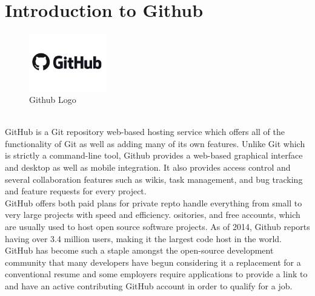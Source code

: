 \section{Introduction to Github}
\begin{figure}[!ht]
\centering
\includegraphics[width=0.3\textwidth]{images/github}                   
\caption{Github Logo}
\hspace{-1.5em}
\end{figure}
\leavevmode\\
GitHub is a Git repository web-based hosting service which offers all of the functionality of Git as well as adding many of its own features. Unlike Git which is strictly a command-line tool, Github provides a web-based graphical interface and desktop as well as mobile integration. It also provides access control and several collaboration features such as wikis, task management, and bug tracking and feature requests for every project.\\

GitHub offers both paid plans for private repto handle everything from small to very large projects with speed and efficiency. ositories, and free accounts, which are usually used to host open source software projects. As of 2014, Github reports having over 3.4 million users, making it the largest code host in the world.\\

GitHub has become such a staple amongst the open-source development community that many developers have begun considering it a replacement for a conventional resume and some employers require applications to provide a link to and have an active contributing GitHub account in order to qualify for a job.\\


